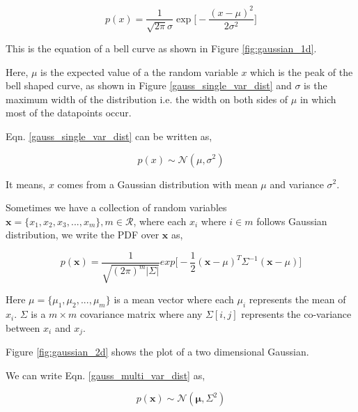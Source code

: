 \documentclass[english]{tktltiki}
\begin{document}
\begin{equation}
p(x) = \frac{1}{\sqrt{2 \pi}\sigma} \exp \Big[-\frac{(x - \mu)^2}{2 \sigma^2}\Big]
\label{gauss_single_var_dist}
\end{equation}



This is the equation of a bell curve as shown in Figure \ref{fig:gaussian_1d}.

Here, $\mu$ is the expected value of a the random variable $x$ which is the peak of the bell shaped curve, as shown in Figure \ref{gauss_single_var_dist} and $\sigma$ is the maximum width of the distribution i.e. the width on both sides of $\mu$ in which most of the datapoints occur.

Eqn. \ref{gauss_single_var_dist} can be written as,

\begin{equation}
p(x) \sim \mathcal{N}(\mu, \sigma^2)
\label{gauss_single_var_sym}
\end{equation}

It means, $x$ comes from a Gaussian distribution with mean $\mu$ and variance $\sigma^2$.

Sometimes we have a collection of random variables $\mathbf{x} = \{x_1, x_2, x_3, ..., x_m\}, m \in \mathcal{R}$, where each $x_i$ where $i \in m$ follows Gaussian distribution, we write the PDF over $\mathbf{x}$ as,

\begin{equation}
p(\mathbf{x}) = \frac{1}{\sqrt{(2 \pi)^m |\Sigma|}}exp \Big[-\frac{1}{2}(\mathbf{x} - \mu)^T \Sigma^{-1} (\mathbf{x} - \mu) \Big]
\label{gauss_multi_var_dist}
\end{equation}

Here $\mu = \{\mu_1, \mu_2, ..., \mu_m\}$ is a mean vector where each $\mu_i$ represents the mean of $x_i$. $\Sigma$ is a $m \times m$ covariance matrix where any $\Sigma[i, j]$ represents the co-variance between $x_i$ and $x_j$.

Figure \ref{fig:gaussian_2d} shows the plot of a two dimensional Gaussian.

We can write Eqn. \ref{gauss_multi_var_dist} as,

\begin{equation}
p(\mathbf{x}) \sim \mathcal{N}(\mathbf{\mu}, \Sigma^2)
\label{gauss_multi_var_sym}
\end{equation}
\end{document}
